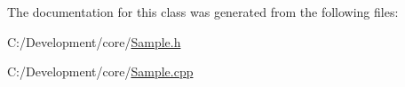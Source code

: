 The documentation for this class was generated from the following files\-:\begin{DoxyCompactItemize}
\item 
C\-:/\-Development/core/\hyperlink{_sample_8h}{Sample.\-h}\item 
C\-:/\-Development/core/\hyperlink{_sample_8cpp}{Sample.\-cpp}\end{DoxyCompactItemize}

